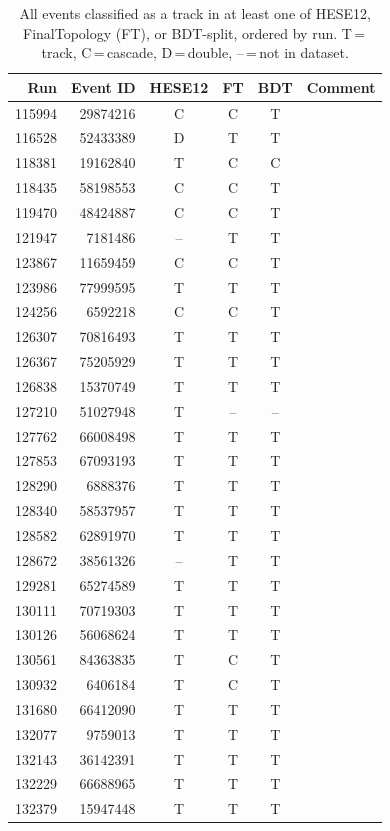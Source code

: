 \begin{table}[htbp]
\centering
\caption{All events classified as a track in at least one of HESE12, FinalTopology (FT), or BDT-split, ordered by run. T\,=\,track, C\,=\,cascade, D\,=\,double, --\,=\,not in dataset.}
\label{tab:track_events_union}
\begin{tabular}{rr ccc l}
\toprule
Run & Event ID & HESE12 & FT & BDT & Comment \\
\midrule
115994 & 29874216 & C & C & T & \\
116528 & 52433389 & D & T & T & \\
118381 & 19162840 & T & C & C & \\
118435 & 58198553 & C & C & T & \\
119470 & 48424887 & C & C & T & \\
121947 & 7181486 & -- & T & T & \\
123867 & 11659459 & C & C & T & \\
123986 & 77999595 & T & T & T & \\
124256 & 6592218 & C & C & T & \\
126307 & 70816493 & T & T & T & \\
126367 & 75205929 & T & T & T & \\
126838 & 15370749 & T & T & T & \\
127210 & 51027948 & T & -- & -- & \\
127762 & 66008498 & T & T & T & \\
127853 & 67093193 & T & T & T & \\
128290 & 6888376 & T & T & T & \\
128340 & 58537957 & T & T & T & \\
128582 & 62891970 & T & T & T & \\
128672 & 38561326 & -- & T & T & \\
129281 & 65274589 & T & T & T & \\
130111 & 70719303 & T & T & T & \\
130126 & 56068624 & T & T & T & \\
130561 & 84363835 & T & C & T & \\
130932 & 6406184 & T & C & T & \\
131680 & 66412090 & T & T & T & \\
132077 & 9759013 & T & T & T & \\
132143 & 36142391 & T & T & T & \\
132229 & 66688965 & T & T & T & \\
132379 & 15947448 & T & T & T & \\

\end{tabular}
\end{table}
